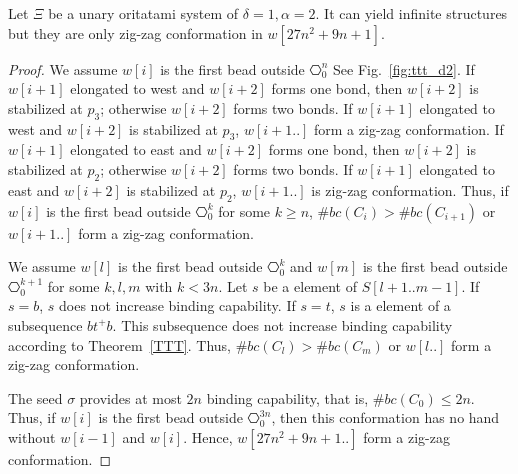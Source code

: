 \begin{theorem}[$\delta= 1, \alpha=2$]
Let $\Xi$ be a unary oritatami system of $\delta = 1, \alpha = 2$. It can yield infinite structures but they are only zig-zag conformation in $w[27n^2 + 9n + 1]$.
\end{theorem}

\begin{proof}
 We assume $w[i]$ is the first bead outside $\hexagon^n_0$
 See Fig.~\ref{fig:ttt_d2}.
 If $w[i+1]$ elongated to west and $w[i+2]$ forms one bond, then $w[i+2]$ is stabilized at $p_3$; otherwise $w[i+2]$ forms two bonds.
 If $w[i+1]$ elongated to west and $w[i+2]$ is stabilized at $p_3$, $w[i+1..]$ form a zig-zag conformation.
  If $w[i+1]$ elongated to east and $w[i+2]$ forms one bond, then $w[i+2]$ is stabilized at $p_2$; otherwise $w[i+2]$ forms two bonds.
 If $w[i+1]$ elongated to east and $w[i+2]$ is stabilized at $p_2$, $w[i+1..]$ is zig-zag conformation.
 Thus, if $w[i]$ is the first bead outside $\hexagon^k_0$ for some $k \geq n$, $\#bc(C_i) > \#bc(C_{i+1})$ or $w[i+1..]$ form a zig-zag conformation.
 
 We assume $w[l]$ is the first bead outside $\hexagon^k_0$ and $w[m]$ is the first bead outside $\hexagon^{k+1}_0$ for some $k,l,m$ with $k<3n$. Let $s$ be a element of $S[l+1..m-1]$. If $s = b$, $s$ does not increase binding capability.
 If $s=t$, $s$ is a element of a subsequence $bt^+b$. This subsequence does not increase binding capability according to Theorem~\ref{TTT}. Thus, $\#bc(C_l) > \#bc(C_{m})$ or $w[l..]$ form a zig-zag conformation.
 
 The seed $\sigma$ provides at most $2n$ binding capability, that is, $\#bc(C_0) \leq 2n$.
 Thus,  if  $w[i]$ is the first bead outside $\hexagon^{3n}_0$, then this conformation has no hand without $w[i-1]$ and $w[i]$.
 Hence, $w[27n^2 + 9n + 1..]$ form a zig-zag conformation.
\end{proof}

